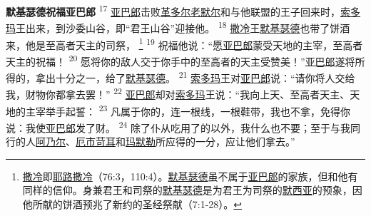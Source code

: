 \textbf{默基瑟德祝福亚巴郎 }
\textsuperscript{17}
\uline{亚巴郎}击败\uline{革多尔}\uline{老默尔}和与他联盟的王子回来时，\uline{索多玛}王出来，到沙委山谷，即“君王山谷”迎接他。
\textsuperscript{18}
\uline{撒冷}王\uline{默基}\uline{瑟德}也带了饼酒来，他是至高者天主的司祭，
\footnote{\uline{撒冷}即\uline{耶路撒冷}（76:3，110:4）。\uline{默基}\uline{瑟德}虽不属于\uline{亚巴郎}的家族，但和他有同样的信仰。身兼君王和司祭的\uline{默基}\uline{瑟德}是为君王为司祭的\uline{默西亚}的预象，因他所献的饼酒预兆了新约的圣经祭献（7:1-28）。}
\textsuperscript{19}
祝福他说：“愿\uline{亚巴郎}蒙受天地的主宰，至高者天主的祝福！
\textsuperscript{20}
愿将你的敌人交于你手中的至高者的天主受赞美！”\uline{亚巴郎}遂将所得的，拿出十分之一，给了\uline{默基}\uline{瑟德}。
\textsuperscript{21}
\uline{索多玛}王对\uline{亚巴郎}说：“请你将人交给我，财物你都拿去罢！”
\textsuperscript{22}
\uline{亚巴郎}却对\uline{索多玛}王说：“我向上天、至高者天主、天地的主宰举手起誓：
\textsuperscript{23}
凡属于你的，连一根线，一根鞋带，我也不拿，免得你说：我使\uline{亚巴郎}发了财。
\textsuperscript{24}
除了仆从吃用了的以外，我什么也不要；至于与我同行的人\uline{阿乃尔}、\uline{厄市}\uline{苛耳}和\uline{玛默勒}所应得的一分，应让他们拿去。”

